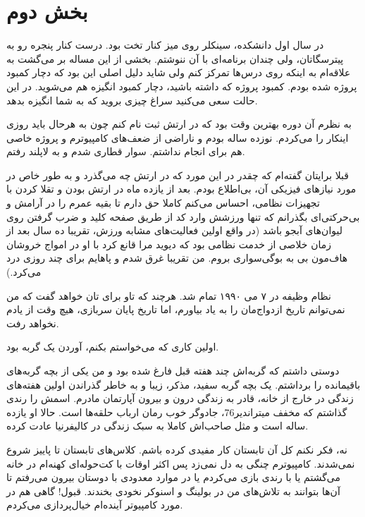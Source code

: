 \section{بخش دوم}
در سال اول دانشکده، سینکلر روی میز کنار تخت بود. درست کنار پنجره رو به
پیترسگاتان، ولی چندان برنامه‌ای با
آن ننوشتم. بخشی از این مساله بر می‌گشت به علاقه‌ام به اینکه روی درس‌ها
تمرکز کنم ولی شاید دلیل اصلی این بود که دچار کمبود پروژه شده
بودم. کمبود پروژه که داشته باشید، دچار کمبود انگیزه هم می‌شوید. در این
حالت سعی می‌کنید سراغ چیزی بروید که به شما انگیزه بدهد.

به نظرم آن دوره بهترین وقت بود که در ارتش ثبت نام کنم چون به هرحال
باید روزی اینکار را می‌کردم. نوزده ساله بودم و ناراضی از ضعف‌های
کامپیوترم و پروژه خاصی هم برای انجام نداشتم. سوار قطاری شدم و به
لاپلند رفتم.

قبلا برایتان گفته‌ام که چقدر در این مورد که در ارتش چه می‌گذرد و به طور
خاص در مورد نیازهای فیزیکی آن، بی‌اطلاع‌ بودم. بعد از یازده ماه در ارتش
بودن و تقلا کردن با تجهیزات نظامی، احساس می‌کنم کاملا حق دارم تا بقیه
عمرم را در آرامش و بی‌حرکتی‌ای بگذرانم که تنها ورزشش وارد کد از طریق
صفحه کلید و ضرب گرفتن روی لیوان‌های آبجو باشد (در واقع اولین فعالیت‌های
مشابه ورزش، تقریبا ده سال بعد از زمان خلاصی از خدمت نظامی بود که دیوید
مرا قانع کرد با او در امواج خروشان هاف‌مون بی
به بوگی‌سواری بروم. من تقریبا غرق شدم و پاهایم
برای چند روزی درد می‌کرد.)

نظام وظیفه در ۷ می ۱۹۹۰ تمام شد. هرچند که تاو برای تان خواهد گفت که من
نمی‌توانم تاریخ ازدواج‌مان را به یاد بیاورم، اما تاریخ پایان سربازی، هیچ
وقت از یادم نخواهد رفت.

اولین کاری که می‌خواستم بکنم، آوردن یک گربه بود.

دوستی داشتم که گربه‌اش چند هفته قبل فارغ شده بود و من یکی از بچه
گربه‌های باقیمانده را برداشتم. یک بچه گربه سفید، مذکر، زیبا و به خاطر
گذراندن اولین هفته‌های زندگی در خارج از خانه، قادر به زندگی درون و
بیرون آپارتمان مادرم. اسمش را رندی گذاشتم که
مخفف میتراندیر76، جادوگر خوب رمان ارباب حلقه‌ها است. حالا او یازده‌ ساله
است و مثل صاحب‌اش کاملا به سبک زندگی در کالیفرنیا عادت کرده.

نه، فکر نکنم کل آن تابستان کار مفیدی کرده باشم. کلاس‌های تابستان تا
پاییز شروع نمی‌شدند. کامپیوترم چنگی به دل نمی‌زد پس اکثر اوقات با
کت‌حوله‌ای کهنه‌ام در خانه می‌گشتم یا با رندی بازی می‌کردم یا در موارد
معدودی با دوستان بیرون می‌رفتم تا آن‌ها بتوانند به تلاش‌های من در بولینگ
و اسنوکر نخودی بخندند. قبول! گاهی هم در مورد کامپیوتر آینده‌ام
خیال‌پردازی می‌کردم.

